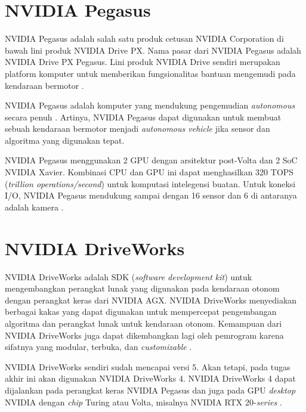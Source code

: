 \section{NVIDIA Pegasus}\label{chapter-2-section-pegasus}

NVIDIA Pegasus adalah salah satu produk cetusan NVIDIA Corporation di bawah lini
produk NVIDIA Drive PX. Nama pasar dari NVIDIA Pegasus adalah NVIDIA Drive
PX Pegasus. Lini produk NVIDIA Drive sendiri merupakan platform komputer untuk
memberikan fungsionalitas bantuan mengemudi pada kendaraan bermotor
\parencite{oh_2017}.


NVIDIA Pegasus adalah komputer yang mendukung pengemudian \textit{autonomous}
secara penuh \parencite{oh_2017}. Artinya, NVIDIA Pegasus dapat digunakan untuk
membuat sebuah kendaraan bermotor menjadi \textit{autonomous vehicle} jika
sensor dan algoritma yang digunakan tepat.

NVIDIA Pegasus menggunakan 2 GPU dengan arsitektur post-Volta dan 2 SoC NVIDIA
Xavier. Kombinasi CPU dan GPU ini dapat menghasilkan 320 TOPS (\textit{trillion
	operations/second}) untuk komputasi intelegensi buatan. Untuk koneksi I/O,
NVIDIA Pegasus mendukung sampai dengan 16 sensor dan 6 di antaranya adalah
kamera \parencite{oh_2017}.

\section{NVIDIA DriveWorks}\label{chapter-2-section-driveworks}

NVIDIA DriveWorks adalah SDK (\textit{software development kit}) untuk
mengembangkan perangkat lunak yang digunakan pada kendaraan otonom dengan
perangkat keras dari NVIDIA AGX. NVIDIA DriveWorks menyediakan berbagai kakas yang
dapat  digunakan untuk mempercepat pengembangan algoritma dan perangkat lunak
untuk kendaraan otonom. Kemampuan dari NVIDIA DriveWorks juga dapat dikembangkan
lagi oleh pemrogram karena sifatnya yang modular, terbuka, dan
\textit{customizable} \parencite{nvidia_driveworksMainSite}.

NVIDIA DriveWorks sendiri sudah mencapai versi 5. Akan tetapi, pada tugas
akhir ini akan digunakan NVIDIA DriveWorks 4. NVIDIA DriveWorks 4 dapat
dijalankan pada perangkat keras  NVIDIA Pegasus dan juga pada GPU
\textit{desktop} NVIDIA dengan \textit{chip} Turing atau Volta, misalnya NVIDIA
RTX 20-\textit{series} \parencite{nvidia_driveworksSdkGettingStarted}.

